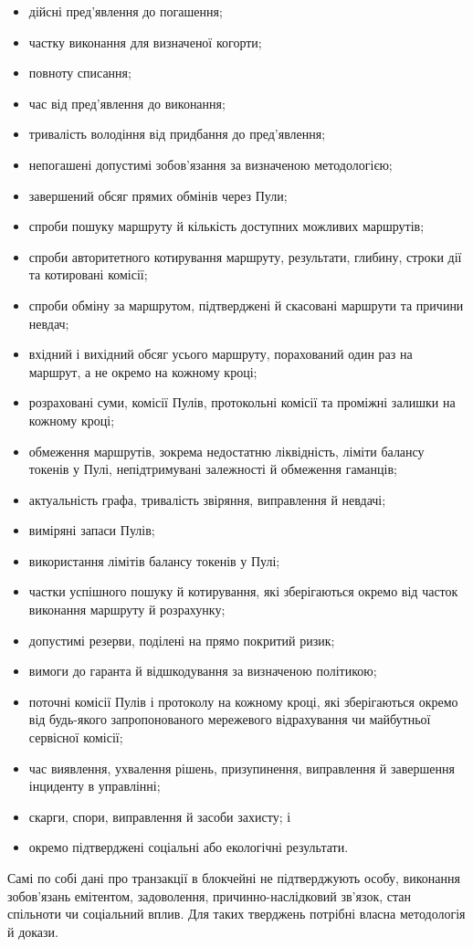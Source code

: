 \documentclass[11pt]{article}
\begin{document}
\begin{itemize}[leftmargin=*]
\item дійсні пред'явлення до погашення;
\item частку виконання для визначеної когорти;
\item повноту списання;
\item час від пред'явлення до виконання;
\item тривалість володіння від придбання до пред'явлення;
\item непогашені допустимі зобов'язання за визначеною методологією;
\item завершений обсяг прямих обмінів через Пули;
\item спроби пошуку маршруту й кількість доступних можливих маршрутів;
\item спроби авторитетного котирування маршруту, результати, глибину, строки дії та котировані комісії;
\item спроби обміну за маршрутом, підтверджені й скасовані маршрути та причини невдач;
\item вхідний і вихідний обсяг усього маршруту, порахований один раз на маршрут, а не окремо на кожному кроці;
\item розраховані суми, комісії Пулів, протокольні комісії та проміжні залишки на кожному кроці;
\item обмеження маршрутів, зокрема недостатню ліквідність, ліміти балансу токенів у Пулі, непідтримувані залежності й обмеження гаманців;
\item актуальність графа, тривалість звіряння, виправлення й невдачі;
\item виміряні запаси Пулів;
\item використання лімітів балансу токенів у Пулі;
\item частки успішного пошуку й котирування, які зберігаються окремо від часток виконання маршруту й розрахунку;
\item допустимі резерви, поділені на прямо покритий ризик;
\item вимоги до гаранта й відшкодування за визначеною політикою;
\item поточні комісії Пулів і протоколу на кожному кроці, які зберігаються окремо від будь-якого запропонованого мережевого відрахування чи майбутньої сервісної комісії;
\item час виявлення, ухвалення рішень, призупинення, виправлення й завершення інциденту в управлінні;
\item скарги, спори, виправлення й засоби захисту; і
\item окремо підтверджені соціальні або екологічні результати.
\end{itemize}
Самі по собі дані про транзакції в блокчейні не підтверджують особу, виконання зобов'язань емітентом, задоволення, причинно-наслідковий зв'язок, стан спільноти чи соціальний вплив. Для таких тверджень потрібні власна методологія й докази.
\end{document}
